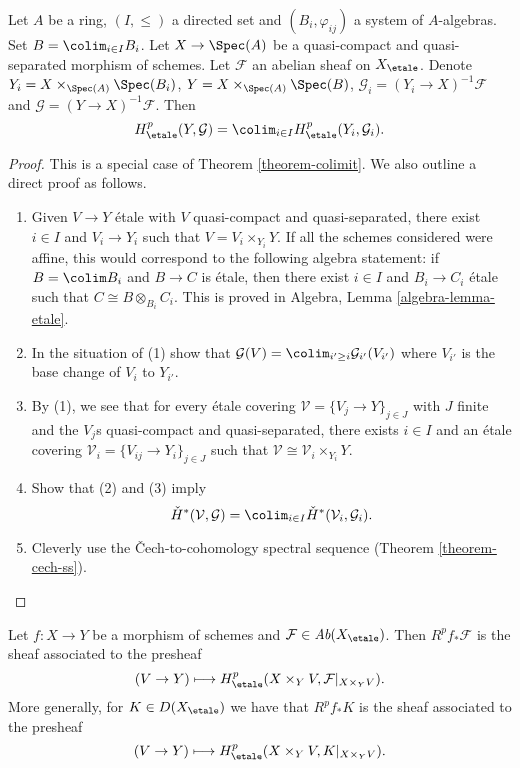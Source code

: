 \begin{lemma}
\label{lemma-directed-colimit-cohomology}
Let $A$ be a ring, $(I, \leq)$ a directed set and $(B_i, \varphi_{ij})$ a
system of $A$-algebras. Set $B = \colim_{i\in I} B_i$. Let $X \to \Spec(A)$
be a quasi-compact and quasi-separated morphism of schemes. Let
$\mathcal{F}$ an abelian sheaf on $X_\etale$.
Denote $Y_i = X \times_{\Spec(A)} \Spec(B_i)$,
$Y = X \times_{\Spec(A)} \Spec(B)$,
$\mathcal{G}_i = (Y_i \to X)^{-1}\mathcal{F}$ and
$\mathcal{G} = (Y \to X)^{-1}\mathcal{F}$. Then
$$
H_\etale^p(Y, \mathcal{G}) =
\colim_{i\in I} H_\etale^p (Y_i, \mathcal{G}_i).
$$
\end{lemma}

\begin{proof}
This is a special case of Theorem \ref{theorem-colimit}.
We also outline a direct proof as follows.
\begin{enumerate}
\item Given $V \to Y$ \'etale with $V$ quasi-compact and
quasi-separated, there exist $i\in I$ and $V_i \to Y_i$ such that
$V = V_i \times_{Y_i} Y$.
If all the schemes considered were affine, this would correspond to the
following algebra statement: if $B = \colim B_i$ and $B \to C$ is \'etale,
then there exist $i \in I$ and $B_i \to C_i$ \'etale such that
$C \cong B \otimes_{B_i} C_i$.
This is proved in Algebra, Lemma \ref{algebra-lemma-etale}.
\item In the situation of (1) show that
$\mathcal{G}(V) = \colim_{i' \geq i} \mathcal{G}_{i'}(V_{i'})$
where $V_{i'}$ is the base change of $V_i$ to $Y_{i'}$.
\item By (1), we see that for every \'etale covering
$\mathcal{V} = \{V_j \to Y\}_{j\in J}$ with $J$ finite and the
$V_j$s quasi-compact and quasi-separated, there exists $i \in I$ and
an \'etale covering $\mathcal{V}_i = \{V_{ij} \to Y_i\}_{j \in J}$
such that $\mathcal{V} \cong \mathcal{V}_i \times_{Y_i} Y$.
\item Show that (2) and (3) imply
$$
\check H^*(\mathcal{V}, \mathcal{G})=
\colim_{i\in I} \check H^*(\mathcal{V}_i, \mathcal{G}_i).
$$
\item Cleverly use the {\v C}ech-to-cohomology spectral sequence
(Theorem \ref{theorem-cech-ss}).
\end{enumerate}
\end{proof}

\begin{lemma}
\label{lemma-higher-direct-images}
Let $f: X\to Y$ be a morphism of schemes and $\mathcal{F}\in
\textit{Ab}(X_\etale)$. Then $R^pf_*\mathcal{F}$ is the sheaf
associated to the presheaf
$$
(V \to Y) \longmapsto H_\etale^p(X \times_Y V, \mathcal{F}|_{X \times_Y V}).
$$
More generally, for $K \in D(X_\etale)$ we have that $R^pf_*K$ is the
sheaf associated to the presheaf
$$
(V \to Y) \longmapsto H_\etale^p(X \times_Y V, K|_{X \times_Y V}).
$$
\end{lemma}


